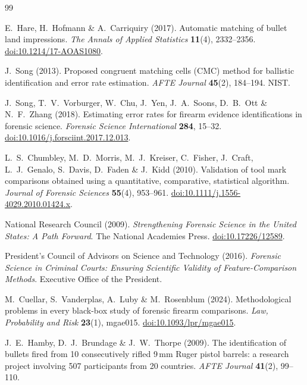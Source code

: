 \documentclass[11pt]{article}
\begin{document}
\begin{thebibliography}{99}
\small

 E.~Hare, H.~Hofmann \& A.~Carriquiry (2017).
  Automatic matching of bullet land impressions. \emph{The Annals of Applied
  Statistics} \textbf{11}(4), 2332--2356. \href{https://doi.org/10.1214/17-AOAS1080}{doi:10.1214/17-AOAS1080}.

 J.~Song (2013). Proposed congruent matching cells (CMC) method
  for ballistic identification and error rate estimation. \emph{AFTE Journal}
  \textbf{45}(2), 184--194. NIST.

 J.~Song, T.~V.~Vorburger, W.~Chu, J.~Yen, J.~A.~Soons,
  D.~B.~Ott \& N.~F.~Zhang (2018). Estimating error rates for firearm evidence
  identifications in forensic science. \emph{Forensic Science International}
  \textbf{284}, 15--32. \href{https://doi.org/10.1016/j.forsciint.2017.12.013}{doi:10.1016/j.forsciint.2017.12.013}.

 L.~S.~Chumbley, M.~D.~Morris, M.~J.~Kreiser, C.~Fisher,
  J.~Craft, L.~J.~Genalo, S.~Davis, D.~Faden \& J.~Kidd (2010). Validation of tool
  mark comparisons obtained using a quantitative, comparative, statistical
  algorithm. \emph{Journal of Forensic Sciences} \textbf{55}(4), 953--961.
  \href{https://doi.org/10.1111/j.1556-4029.2010.01424.x}{doi:10.1111/j.1556-4029.2010.01424.x}.

 National Research Council (2009). \emph{Strengthening Forensic
  Science in the United States: A Path Forward}. The National Academies Press.
  \href{https://doi.org/10.17226/12589}{doi:10.17226/12589}.

 President's Council of Advisors on Science and Technology
  (2016). \emph{Forensic Science in Criminal Courts: Ensuring Scientific Validity
  of Feature-Comparison Methods}. Executive Office of the President.

 M.~Cuellar, S.~Vanderplas, A.~Luby \& M.~Rosenblum (2024).
  Methodological problems in every black-box study of forensic firearm
  comparisons. \emph{Law, Probability and Risk} \textbf{23}(1), mgae015.
  \href{https://doi.org/10.1093/lpr/mgae015}{doi:10.1093/lpr/mgae015}.

 J.~E.~Hamby, D.~J.~Brundage \& J.~W.~Thorpe (2009). The
  identification of bullets fired from 10 consecutively rifled 9\,mm Ruger pistol
  barrels: a research project involving 507 participants from 20 countries.
  \emph{AFTE Journal} \textbf{41}(2), 99--110.


\end{thebibliography}
\end{document}
